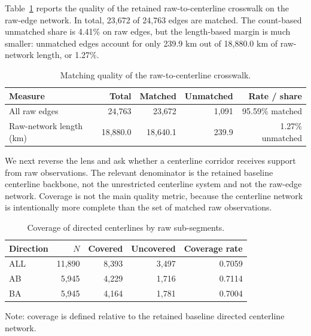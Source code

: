 \documentclass[12pt]{article}
\begin{document}
	Table~\ref{tab:match-summary-v11} reports the quality of the retained raw-to-centerline crosswalk on the raw-edge network. In total, 23,672 of 24,763 edges are matched. The count-based unmatched share is 4.41\% on raw edges, but the length-based margin is much smaller: unmatched edges account for only 239.9 km out of 18,880.0 km of raw-network length, or 1.27\%.
	
	\begin{table}[h!]
		\centering
		\caption{Matching quality of the raw-to-centerline crosswalk.}
		\label{tab:match-summary-v11}
		\begin{tabular}{l r r r r}
			\toprule
			Measure & Total & Matched & Unmatched & Rate / share \\
			\midrule
			All raw edges & 24,763 & 23,672 & 1,091 & 95.59\% matched \\
			Raw-network length (km) & 18,880.0 & 18,640.1 & 239.9 & 1.27\% unmatched \\
			\bottomrule
		\end{tabular}
	\end{table}
	
	We next reverse the lens and ask whether a centerline corridor receives support from raw observations. The relevant denominator is the retained baseline centerline backbone, not the unrestricted centerline system and not the raw-edge network. Coverage is not the main quality metric, because the centerline network is intentionally more complete than the set of matched raw observations. 
	
	\begin{table}[h!]
		\centering
		\caption{Coverage of directed centerlines by raw sub-segments.}
		\label{tab:directed-coverage}
		\begin{tabular}{l r r r r}
			\toprule
			Direction & $N$ & Covered & Uncovered & Coverage rate \\
			\midrule
			ALL & 11,890 & 8,393 & 3,497 & 0.7059 \\
			AB  & 5,945 & 4,229 & 1,716 & 0.7114 \\
			BA  & 5,945 & 4,164 & 1,781 & 0.7004 \\
			\bottomrule
		\end{tabular}
		\vspace{0.3em}
		\begin{minipage}{\textwidth}
			\footnotesize
			\raggedright
			Note: coverage is defined relative to the retained baseline directed centerline network.
		\end{minipage}
	\end{table}
	
\end{document}
